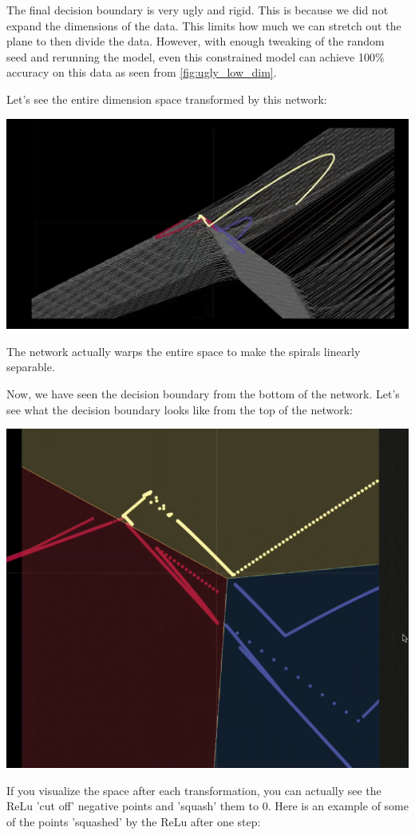 The final decision boundary is very ugly and rigid. 
This is because we did not expand the dimensions of the data. 
This limits how much we can stretch out the plane to then divide the data. 
However, with enough tweaking of the random seed and rerunning the model, even this constrained model can achieve 100\% accuracy on this data as seen from \cref{fig:ugly_low_dim}. 

Let's see the entire dimension space transformed by this network:

\begin{center}
	\includegraphics[width=0.85\linewidth]{lectures/03-a/images/stretch.png}
\end{center}

The network actually warps the entire space to make the spirals linearly separable. 

Now, we have seen the decision boundary from the bottom of the network. 
Let's see what the decision boundary looks like from the top of the network:

\begin{center}
	\includegraphics[width=0.5\linewidth]{lectures/03-a/images/top_view_boundary.png}
\end{center}

If you visualize the space after each transformation, you can actually see the ReLu 'cut off' negative points and 'squash' them to 0. 
Here is an example of some of the points 'squashed' by the ReLu after one step:

